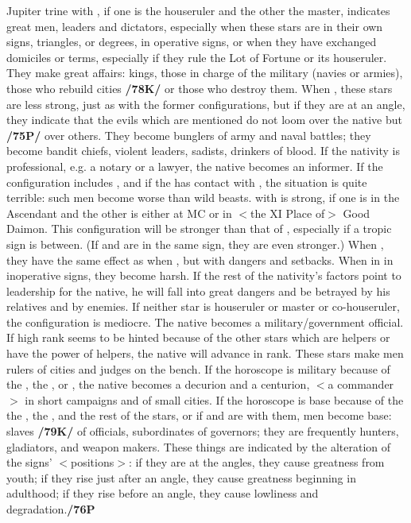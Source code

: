 Jupiter \marginnote{\Jupiter \Trine \Mars} trine with \Mars, if one is the houseruler and the other the master, indicates great men, leaders and dictators, especially when these stars are in their own signs, triangles, or degrees, in operative signs, or when they have exchanged domiciles or terms, especially if they rule the Lot of Fortune or its houseruler. They make great affairs: kings, those in charge of the military (navies or armies), those who rebuild cities
\textbf{/78K/} or those who destroy them. When \Sextile, these stars are less strong, just as with the former configurations, but if they are at an \mndl angle, they indicate that the evils which are mentioned do not loom over the native but \textbf{/75P/} over others. They become bunglers of army and naval battles; they become bandit chiefs, violent leaders, sadists, drinkers of blood. If the nativity is professional, e.g. a notary or a lawyer, the native becomes an informer. If the configuration includes \Mercury, and if the \Moon\xspace has contact with \Mars, the situation is quite terrible: such men become worse than wild beasts. \Jupiter\xspace \Square\xspace with \Mars\xspace is strong, if one is in the Ascendant and the other is either at MC or in $<$the
XI Place of$>$ Good Daimon. This configuration will be stronger than that of \Trine, especially if a tropic
sign is between. (If \Jupiter\xspace and \Mars\xspace are in the same sign, they are even stronger.) When \Square, they
have the same effect as when \Trine, but with dangers and setbacks. When in \Opposition in inoperative signs, they become harsh. If the rest of the nativity’s factors point to leadership for the native, he will fall into great dangers and be betrayed by his relatives and by enemies. \mndl If neither star is houseruler or master or co-houseruler, the \Trine\xspace configuration is mediocre. The native becomes a military/government official. If high rank seems to be hinted because of the other stars which are helpers or have the power of helpers, the native will advance in rank. These stars make men rulers of cities and judges on the bench. If the horoscope is military because of the \Sun, the \Moon, or \Saturn, the native becomes a decurion and a centurion, $<$a commander$>$ in short campaigns and of small cities. If the horoscope is base because of the the \Sun, the \Moon, and the rest of the stars, or if \Mars\xspace and \Jupiter\xspace are \Trine\xspace with them, men become base: slaves \textbf{/79K/} of officials, subordinates of governors; they are frequently hunters, gladiators, and weapon makers. \mndl These things are indicated by the alteration of the signs’ $<$positions$>$: if they are at the angles, they cause greatness from youth; if they rise just after an angle, they cause greatness beginning in adulthood; if they rise before an angle, they cause lowliness and degradation.\textbf{/76P}

\newpage